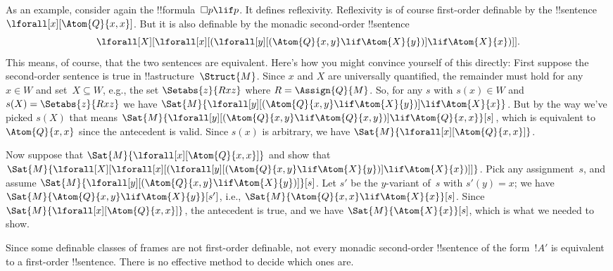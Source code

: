 \documentclass[../../../include/open-logic-section]{subfiles}
\begin{document}
As an example, consider again the !!{formula}~$\Box p \lif p$. It
defines reflexivity. Reflexivity is of course first-order definable by
the !!{sentence}~$\lforall[x][\Atom{Q}{x,x}]$. But it is also definable by the
monadic second-order !!{sentence}
\[
\lforall[X][\lforall[x][(\lforall[y][(\Atom{Q}{x,y} \lif \Atom{X}{y})]
    \lif \Atom{X}{x})]].
\]
This means, of course, that the two sentences are equivalent. Here's
how you might convince yourself of this directly: First suppose the
second-order sentence is true in !!a{structure}~$\Struct{M}$. Since $x$ and $X$
are universally quantified, the remainder must hold for any $x \in W$
and set~$X \subseteq W$, e.g., the set $\Setabs{z}{Rxz}$ where $R =
\Assign{Q}{M}$. So, for any $s$ with $s(x) \in W$ and $s(X) =
\Setabs{z}{Rxz}$ we have $\Sat{M}{\lforall[y][(\Atom{Q}{x,y} \lif
    \Atom{X}{y})] \lif \Atom{X}{x}}$. But by the way we've picked
$s(X)$ that means $\Sat{M}{\lforall[y][(\Atom{Q}{x,y} \lif
    \Atom{Q}{x,y})] \lif \Atom{Q}{x,x}}[s]$, which is equivalent to
$\Atom{Q}{x,x}$ since the antecedent is valid. Since $s(x)$ is
arbitrary, we have $\Sat{M}{\lforall[x][\Atom{Q}{x,x}]}$.

Now suppose that $\Sat{M}{\lforall[x][\Atom{Q}{x,x}]}$ and show that
$\Sat{M}{\lforall[X][\lforall[x][(\lforall[y][(\Atom{Q}{x,y} \lif
        \Atom{X}{y})] \lif \Atom{X}{x})]]}$. Pick any assignment~$s$,
and assume $\Sat{M}{\lforall[y][(\Atom{Q}{x,y} \lif
    \Atom{X}{y})]}[s]$. Let $s'$ be the $y$-variant of~$s$ with $s'(y)
= x$; we have $\Sat{M}{\Atom{Q}{x,y} \lif \Atom{X}{y}}[s']$, i.e.,
$\Sat{M}{\Atom{Q}{x,x} \lif \Atom{X}{x}}[s]$. Since
$\Sat{M}{\lforall[x][\Atom{Q}{x,x}]}$, the antecedent is true, and we
have $\Sat{M}{\Atom{X}{x}}[s]$, which is what we needed to show.

Since some definable classes of frames are not first-order definable,
not every monadic second-order !!{sentence} of the form~$!A'$ is
equivalent to a first-order !!{sentence}. There is no effective method
to decide which ones are.
\end{document}
